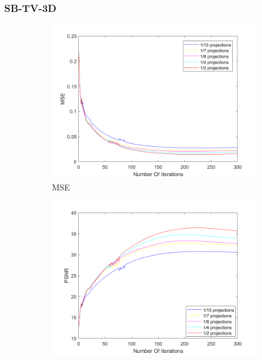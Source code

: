 \subsubsection{SB-TV-3D}
\begin{figure}[ht!]
		
       		\centering
      		\begin{subfigure}[b]{0.475\textwidth}
            	\centering
            	\includegraphics[width=\textwidth]{../../data/res/SB_Reconstruction/Errors/Err_MSE_3D_AllProj_Target1.png}
            	\caption{MSE}    
            	\label{subfig:Target1Fully3D}
        	\end{subfigure}
        	\hfill
        	\begin{subfigure}[b]{0.475\textwidth}  
            	\centering 
            	\includegraphics[width=\textwidth]{../../data/res/SB_Reconstruction/Errors/Err_PSNR_3D_AllProj_Target1.png}

\end{subfigure}
\end{figure}
